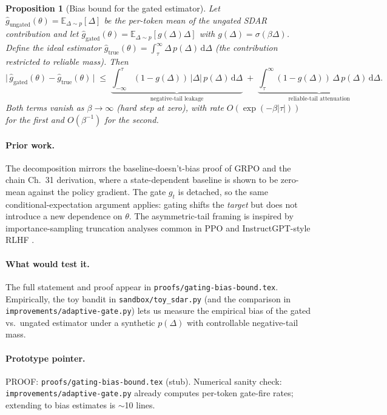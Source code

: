 \documentclass[11pt]{article}
\newtheorem{proposition}{Proposition}
\begin{document}
\begin{proposition}[Bias bound for the gated estimator]
\label{prop:bias}
Let $\hat g_{\text{ungated}}(\theta)
   = \mathbb{E}_{\Delta\sim p}[\Delta]$ be the per-token mean of the
ungated SDAR contribution and let
$\hat g_{\text{gated}}(\theta) = \mathbb{E}_{\Delta\sim p}[g(\Delta)\Delta]$
with $g(\Delta) = \sigma(\beta\Delta)$.  Define the \emph{ideal} estimator
$\hat g_{\text{true}}(\theta) = \int_{\tau}^{\infty}\Delta\,p(\Delta)\,
\mathrm{d}\Delta$ (the contribution restricted to reliable mass).  Then
\[
\bigl|\,\hat g_{\text{gated}}(\theta) - \hat g_{\text{true}}(\theta)\,\bigr|
\;\le\;
\underbrace{\int_{-\infty}^{\tau}\!(1\!-\!g(\Delta))\,|\Delta|\,p(\Delta)\,
\mathrm{d}\Delta}_{\text{negative-tail leakage}}
\;+\;
\underbrace{\int_{\tau}^{\infty}\!(1\!-\!g(\Delta))\,\Delta\,p(\Delta)\,
\mathrm{d}\Delta}_{\text{reliable-tail attenuation}}.
\]
Both terms vanish as $\beta\to\infty$ (hard step at zero), with rate
$O(\exp(-\beta|\tau|))$ for the first and $O(\beta^{-1})$ for the second.
\end{proposition}

\paragraph{Prior work.}  The decomposition mirrors the
baseline-doesn't-bias proof of GRPO \citep{shao2024deepseekmath} and the
chain Ch.~31 derivation, where a state-dependent baseline is shown to be
zero-mean against the policy gradient.  The gate $g_t$ is detached, so the
same conditional-expectation argument applies: gating shifts the
\emph{target} but does not introduce a new dependence on $\theta$.  The
asymmetric-tail framing is inspired by importance-sampling truncation
analyses common in PPO \citep{schulman2017ppo} and
InstructGPT-style RLHF \citep{ouyang2022instructgpt}.

\paragraph{What would test it.}  The full statement and proof appear in
\texttt{proofs/gating-bias-bound.tex}.  Empirically, the toy bandit in
\texttt{sandbox/toy\_sdar.py} (and the comparison in
\texttt{improvements/adaptive-gate.py}) lets us measure the empirical bias
of the gated vs.\ ungated estimator under a synthetic $p(\Delta)$ with
controllable negative-tail mass.

\paragraph{Prototype pointer.}  PROOF: \texttt{proofs/gating-bias-bound.tex}
(stub).  Numerical sanity check: \texttt{improvements/adaptive-gate.py}
already computes per-token gate-fire rates; extending to bias estimates is
$\sim$10 lines.
\end{document}
